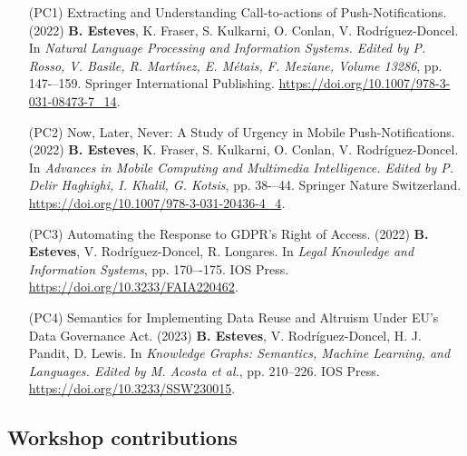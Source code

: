 \begin{enumerate}
    \item [(PC1)] Extracting and Understanding Call-to-actions of Push-Notifications. (2022) \textbf{B. Esteves}, K. Fraser, S. Kulkarni, O. Conlan, V. Rodríguez-Doncel.  In \textit{Natural Language Processing and Information Systems. Edited by P. Rosso, V. Basile, R. Martínez, E. Métais, F. Meziane, Volume 13286}, pp. 147-–159. Springer International Publishing. \url{https://doi.org/10.1007/978-3-031-08473-7\_14}.
    \item [(PC2)] Now, Later, Never: A Study of Urgency in Mobile Push-Notifications. (2022) \textbf{B. Esteves}, K. Fraser, S. Kulkarni, O. Conlan, V. Rodríguez-Doncel. In \textit{Advances in Mobile Computing and Multimedia Intelligence. Edited by P. Delir Haghighi, I. Khalil, G. Kotsis}, pp. 38-–44. Springer Nature Switzerland. \url{https://doi.org/10.1007/978-3-031-20436-4\_4}.
    \item [(PC3)] Automating the Response to GDPR’s Right of Access. (2022) \textbf{B. Esteves}, V. Rodríguez-Doncel, R. Longares. In \textit{Legal Knowledge and Information Systems}, pp. 170–-175. IOS Press. \url{https://doi.org/10.3233/FAIA220462}.
    \item [(PC4)] Semantics for Implementing Data Reuse and Altruism Under EU’s Data Governance Act. (2023) \textbf{B. Esteves}, V. Rodríguez-Doncel,  H. J. Pandit, D. Lewis. In \textit{Knowledge Graphs: Semantics, Machine Learning, and Languages. Edited by M. Acosta et al.}, pp. 210--226. IOS Press. \url{https://doi.org/10.3233/SSW230015}.
\end{enumerate}

\subsection{Workshop contributions}
\label{sec:publications_workshop}

